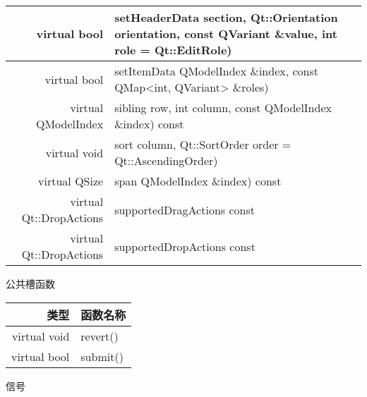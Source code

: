\begin{longtable}{|r|l|}
\hline
virtual bool	&setHeaderData section, Qt::Orientation orientation, const QVariant \&value, int role = Qt::EditRole)\\
\hline
virtual bool	&setItemData QModelIndex \&index, const QMap<int, QVariant> \&roles)\\
\hline
virtual QModelIndex&	sibling row, int column, const QModelIndex \&index) const\\
\hline
virtual void	&sort column, Qt::SortOrder order = Qt::AscendingOrder)\\
\hline
virtual QSize	&span QModelIndex \&index) const\\
\hline
virtual Qt::DropActions	&supportedDragActions const\\
\hline
virtual Qt::DropActions	&supportedDropActions const\\
\hline
\end{longtable}

\splitLine

公共槽函数

\begin{tabular}{|r|l|}
\hline
类型 & 函数名称 \\
\hline
virtual void	&revert()\\
\hline
virtual bool	&submit()\\
\hline
\end{tabular}

\splitLine

信号

